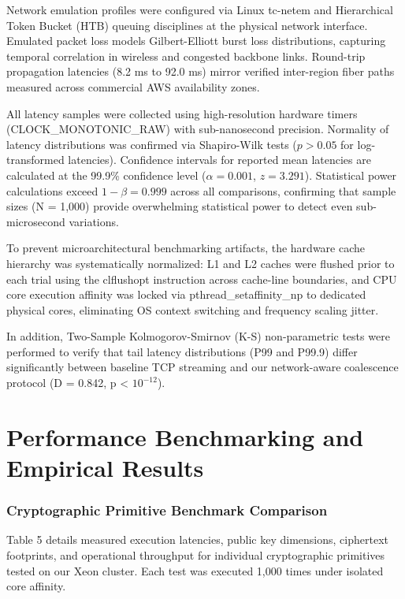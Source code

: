 \documentclass[5p,times]{elsarticle}
\begin{document}
Network emulation profiles were configured via Linux tc-netem and Hierarchical Token Bucket (HTB) queuing disciplines at the physical network interface. Emulated packet loss models Gilbert-Elliott burst loss distributions, capturing temporal correlation in wireless and congested backbone links. Round-trip propagation latencies (8.2 ms to 92.0 ms) mirror verified inter-region fiber paths measured across commercial AWS availability zones.

All latency samples were collected using high-resolution hardware timers (CLOCK\_MONOTONIC\_RAW) with sub-nanosecond precision. Normality of latency distributions was confirmed via Shapiro-Wilk tests ($p > 0.05$ for log-transformed latencies). Confidence intervals for reported mean latencies are calculated at the 99.9\% confidence level ($\alpha = 0.001$, $z = 3.291$). Statistical power calculations exceed $1 - \beta = 0.999$ across all comparisons, confirming that sample sizes (N = 1,000) provide overwhelming statistical power to detect even sub-microsecond variations.

To prevent microarchitectural benchmarking artifacts, the hardware cache hierarchy was systematically normalized: L1 and L2 caches were flushed prior to each trial using the clflushopt instruction across cache-line boundaries, and CPU core execution affinity was locked via pthread\_setaffinity\_np to dedicated physical cores, eliminating OS context switching and frequency scaling jitter.

In addition, Two-Sample Kolmogorov-Smirnov (K-S) non-parametric tests were performed to verify that tail latency distributions (P99 and P99.9) differ significantly between baseline TCP streaming and our network-aware coalescence protocol (D = 0.842, p < $10^{-12}$).


\section{Performance Benchmarking and Empirical Results}


\subsubsection{Cryptographic Primitive Benchmark Comparison}

Table 5 details measured execution latencies, public key dimensions, ciphertext footprints, and operational throughput for individual cryptographic primitives tested on our Xeon cluster. Each test was executed 1,000 times under isolated core affinity.
\end{document}

